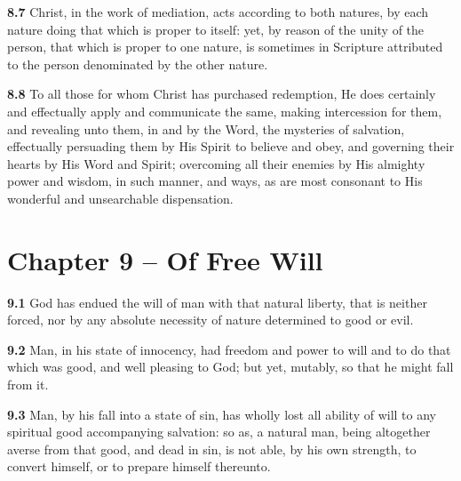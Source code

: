 \par\textbf{8.7} Christ, in the work of mediation, acts according to both natures, by each nature doing that which is proper to itself: yet, by reason of the unity of the person, that which is proper to one nature, is sometimes in Scripture attributed to the person denominated by the other nature.   



\par\textbf{8.8} To all those for whom Christ has purchased redemption, He does certainly and effectually apply and communicate the same, making intercession for them, and revealing unto them, in and by the Word, the mysteries of salvation, effectually persuading them by His Spirit to believe and obey, and governing their hearts by His Word and Spirit; overcoming all their enemies by His almighty power and wisdom, in such manner, and ways, as are most consonant to His wonderful and unsearchable dispensation.  

\section{Chapter 9 -- Of Free Will}

\par\textbf{9.1} God has endued the will of man with that natural liberty, that is neither forced, nor by any absolute necessity of nature determined to good or evil.   

\par\textbf{9.2} Man, in his state of innocency, had freedom and power to will and to do that which was good, and well pleasing to God; but yet, mutably, so that he might fall from it.   

\par\textbf{9.3} Man, by his fall into a state of sin, has wholly lost all ability of will to any spiritual good accompanying salvation: so as, a natural man, being altogether averse from that good, and dead in sin, is not able, by his own strength, to convert himself, or to prepare himself thereunto.    

